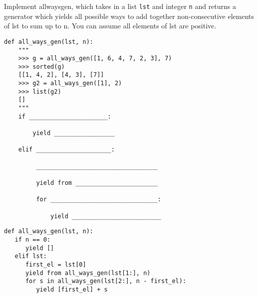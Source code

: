 \begin{blocksection}
\question Implement all\textunderscore ways\textunderscore gen, which takes in a list \texttt{lst} and integer \texttt{n} and returns a generator which yields all possible ways to add together non-consecutive elements of lst to sum up to n. You can assume all elements of lst are positive.
\newline
\begin{lstlisting}
def all_ways_gen(lst, n):
    """
    >>> g = all_ways_gen([1, 6, 4, 7, 2, 3], 7)
    >>> sorted(g)
    [[1, 4, 2], [4, 3], [7]]
    >>> g2 = all_ways_gen([1], 2)
    >>> list(g2)
    []
    """
    if ______________________:
		
        yield _________________
				
    elif _____________________:

         __________________________________

         yield from _______________________
    
         for ______________________________:

             yield _________________________
\end{lstlisting}
\begin{solution}
\begin{lstlisting}
def all_ways_gen(lst, n):
   if n == 0:
      yield []
   elif lst:
      first_el = lst[0]
      yield from all_ways_gen(lst[1:], n)
      for s in all_ways_gen(lst[2:], n - first_el):
         yield [first_el] + s
\end{lstlisting}
\end{solution}
\end{blocksection}